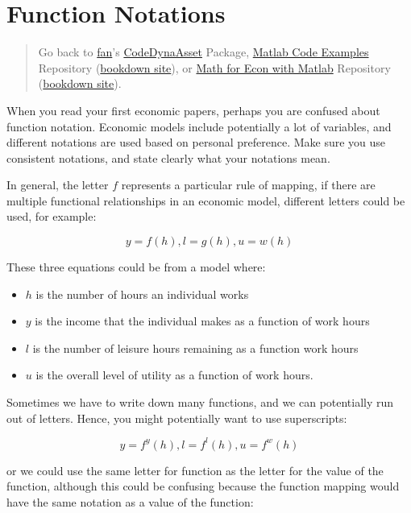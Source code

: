 \documentclass[
]{book}
\begin{document}
\hypertarget{function-notations}{%
\section{Function Notations}\label{function-notations}}

\begin{quote}
Go back to \href{http://fanwangecon.github.io/}{fan}'s \href{https://fanwangecon.github.io/CodeDynaAsset/}{CodeDynaAsset} Package, \href{https://fanwangecon.github.io/M4Econ/}{Matlab Code Examples} Repository (\href{https://fanwangecon.github.io/M4Econ/bookdown}{bookdown site}), or \href{https://fanwangecon.github.io/Math4Econ/}{Math for Econ with Matlab} Repository (\href{https://fanwangecon.github.io/Math4Econ/bookdown}{bookdown site}).
\end{quote}

When you read your first economic papers, perhaps you are confused about
function notation. Economic models include potentially a lot of
variables, and different notations are used based on personal
preference. Make sure you use consistent notations, and state clearly
what your notations mean.

In general, the letter \(f\) represents a particular rule of mapping, if
there are multiple functional relationships in an economic model,
different letters could be used, for example:

\[y=f(h),l=g(h),u=w(h)\]

These three equations could be from a model where:

\begin{itemize}
\item
  \(h\) is the number of hours an individual works
\item
  \(y\) is the income that the individual makes as a function of work
  hours
\item
  \(l\) is the number of leisure hours remaining as a function work
  hours
\item
  \(u\) is the overall level of utility as a function of work hours.
\end{itemize}

Sometimes we have to write down many functions, and we can potentially
run out of letters. Hence, you might potentially want to use
superscripts:

\[y=f^y (h),l=f^l (h),u=f^w (h)\]

or we could use the same letter for function as the letter for the value
of the function, although this could be confusing because the function
mapping would have the same notation as a value of the function:
\end{document}
